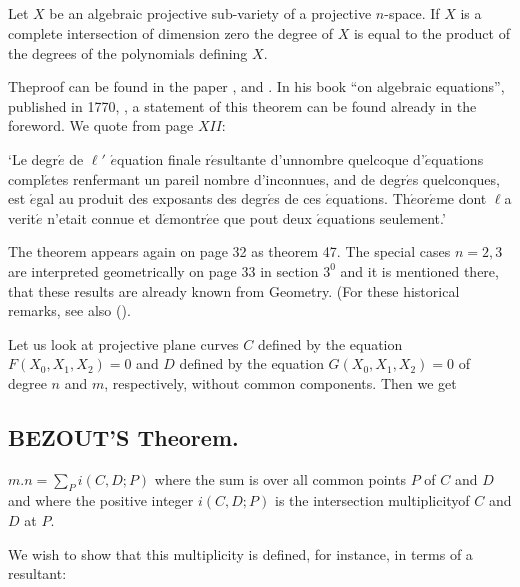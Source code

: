 \subsection{}\label{chap0:sec1:subsec0.2}%
Let $X$ be an algebraic projective
  sub-variety of a projective $n$-space. If $X$ is a complete
  intersection of dimension zero the degree of $X$ is equal to the
  product of the degrees of the polynomials defining $X$. 
 
The\pageoriginale proof can be found in the paper \cite{4}, \cite{5}
and \cite{6}. In his 
book ``on algebraic equations'', published in 1770, \cite{7}, a
statement of this theorem can be found already in the foreword. We
quote from page $XII$: 

`Le degr$\acute{e}$ de $\ell'$ $\acute{e}$quation finale
r$\acute{e}$sultante d'unnombre quelcoque d'$\acute{e}$quations
compl$\acute{e}$tes renfermant un pareil nombre d'inconnues, and de
degr$\acute{e}$s quelconques, est $\acute{e}$gal au produit des
exposants des degr$\acute{e}$s de ces
$\acute{e}$quations. Th$\acute{e}$or$\acute{e}$me dont $\ell$a
verit$\acute{e}$ n'etait connue et d$\acute{e}$montr$\acute{e}$e que
pout deux $\acute{e}$quations seulement.' 

The theorem appears again on page 32 as theorem 47. The special
cases $n = 2,3$ are interpreted geometrically on page 33 in section
$3^0$ and it is mentioned there, that these results are already known
from Geometry. (For these historical remarks, see also (\cite{61}). 

Let us look at projective plane curves $C$ defined by the equation $F
(X_0,X_1,X_2) = 0$ and $D$  defined by the equation $G (X_0,X_1,X_2) =
0$ of degree $n$ and $m$, respectively, without common
components. Then we get 

\subsection{BEZOUT'S Theorem.}\label{chap0:sec1:subsec0.3}%
 $m.n = \sum\limits_P i (C, D; P)$
 where the sum is over all common points $P$ of $C$ and $D$
  and where the positive integer $i(C, D;P)$ is the intersection
  multiplicity\pageoriginale of $C$ and $D$ at $P$. 

We wish to show that this multiplicity is defined, for instance, in
terms of a resultant: 

